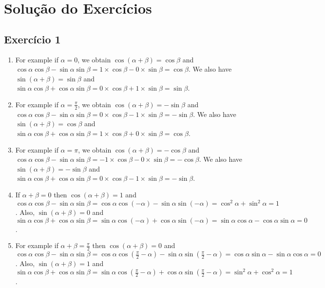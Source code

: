 \section{Solução do Exercícios}

\subsection*{Exercício 1}

\begin{enumerate}
\item For example if $\alpha = 0$, we obtain
  $\cos\left(\alpha+\beta\right) = \cos \beta$
  and $\cos \alpha \cos \beta - \sin \alpha \sin \beta = 1 \times \cos \beta
  - 0 \times \sin \beta = \cos \beta$.
  We also have
  $\sin\left(\alpha+\beta\right) = \sin \beta$ and
  $\sin \alpha \cos \beta + \cos \alpha \sin \beta  =
  0 \times \cos \beta + 1 \times \sin \beta = \sin \beta$.

\item For example if $\alpha = \frac{\pi}{2}$, we obtain
  $\cos\left(\alpha+\beta\right) = -\sin \beta$
  and $\cos \alpha \cos \beta - \sin \alpha \sin \beta = 0 \times \cos \beta
  - 1 \times \sin \beta = -\sin \beta$.
  We also have
  $\sin\left(\alpha+\beta\right) = \cos \beta$ and
  $\sin \alpha \cos \beta + \cos \alpha \sin \beta  =
  1 \times \cos \beta + 0 \times \sin \beta = \cos \beta$.

\item For example if $\alpha = \pi$, we obtain
  $\cos\left(\alpha+\beta\right) = -\cos \beta$
  and $\cos \alpha \cos \beta - \sin \alpha \sin \beta = -1 \times \cos \beta
  - 0 \times \sin \beta = -\cos \beta$.
  We also have
  $\sin\left(\alpha+\beta\right) = -\sin \beta$ and
  $\sin \alpha \cos \beta + \cos \alpha \sin \beta  =
  0 \times \cos \beta -1 \times \sin \beta = -\sin \beta$.

\item If $\alpha + \beta = 0$ then
  $\cos\left(\alpha+\beta\right) = 1$
  and $\cos \alpha \cos \beta - \sin \alpha \sin \beta =
  \cos \alpha \cos \left(- \alpha \right)
  - \sin \alpha \sin \left(- \alpha \right) =
  \cos^2 \alpha + \sin^2 \alpha = 1$.
  Also,
  $\sin\left(\alpha+\beta\right) = 0$ and
  $\sin \alpha \cos \beta + \cos \alpha \sin \beta  =
  \sin \alpha \cos \left( - \alpha \right) + \cos \alpha
  \sin \left(- \alpha \right) =
  \sin \alpha \cos \alpha - \cos \alpha \sin \alpha = 0$.

\item For example if $\alpha+\beta = \frac{\pi}{2}$ then
  $\cos\left(\alpha+\beta\right) = 0$
  and $\cos \alpha \cos \beta - \sin \alpha \sin \beta =
  \cos \alpha \cos \left(\frac{\pi}{2} - \alpha \right)
  - \sin \alpha \sin \left(\frac{\pi}{2} - \alpha \right) =
  \cos \alpha \sin \alpha - \sin \alpha \cos \alpha = 0$.
  Also,
  $\sin\left(\alpha+\beta\right) = 1$ and
  $\sin \alpha \cos \beta + \cos \alpha \sin \beta  =
  \sin \alpha \cos \left(\frac{\pi}{2} - \alpha \right) + \cos \alpha
  \sin \left(\frac{\pi}{2} - \alpha \right) = \sin^2 \alpha + \cos^2 \alpha =
  1$.


\end{enumerate}
